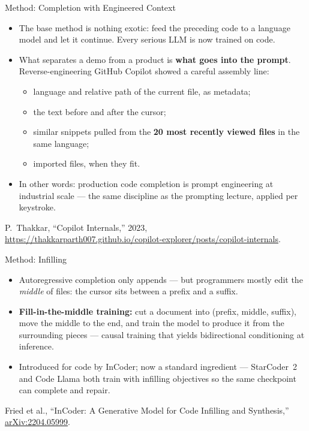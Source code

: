 \begin{frame}{Method: Completion with Engineered Context}
  \begin{itemize}\itemsep0.4em
    \item[\textcolor{red}{$\triangleright$}] The base method is nothing exotic: feed the preceding code to a
      language model and let it continue. Every serious LLM is now trained on code.
    \item[\textcolor{red}{$\triangleright$}] What separates a demo from a product is \textbf{what goes into
      the prompt}. Reverse-engineering GitHub Copilot showed a careful assembly line:
    \begin{itemize}
      \item language and relative path of the current file, as metadata;
      \item the text before and after the cursor;
      \item similar snippets pulled from the \textbf{20 most recently viewed files} in the same language;
      \item imported files, when they fit.
    \end{itemize}
    \item[\textcolor{red}{$\triangleright$}] In other words: production code completion is prompt
      engineering at industrial scale --- the same discipline as the prompting lecture, applied per keystroke.
  \end{itemize}
  \vspace{0.3em}
  {\scriptsize P.~Thakkar, ``Copilot Internals,'' 2023,
  \url{https://thakkarparth007.github.io/copilot-explorer/posts/copilot-internals}.}
\end{frame}

\begin{frame}{Method: Infilling}
  \begin{itemize}\itemsep0.5em
    \item[\textcolor{red}{$\triangleright$}] Autoregressive completion only appends --- but programmers
      mostly edit the \emph{middle} of files: the cursor sits between a prefix and a suffix.
    \item[\textcolor{red}{$\triangleright$}] \textbf{Fill-in-the-middle training:} cut a document into
      (prefix, middle, suffix), move the middle to the end, and train the model to produce it from the
      surrounding pieces --- causal training that yields bidirectional conditioning at inference.
    \item[\textcolor{red}{$\triangleright$}] Introduced for code by InCoder; now a standard ingredient ---
      StarCoder~2 and Code Llama both train with infilling objectives so the same checkpoint can complete
      and repair.
  \end{itemize}
  \vspace{0.3em}
  {\scriptsize Fried et al., ``InCoder: A Generative Model for Code Infilling and Synthesis,''
  \href{https://arxiv.org/abs/2204.05999}{arXiv:2204.05999}.}
\end{frame}

